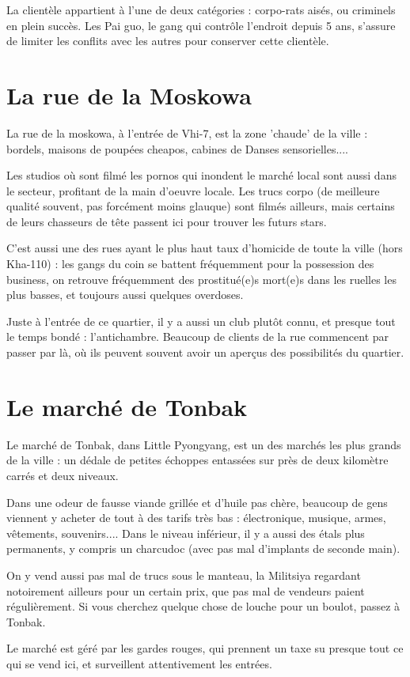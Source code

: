 \documentclass[10pt,a4paper]{book}
\begin{document}
La clientèle appartient à l'une de deux catégories : corpo-rats aisés, ou criminels en plein succès. Les Pai guo, le gang qui contrôle l'endroit depuis 5 ans, s'assure de limiter les conflits avec les autres pour conserver cette clientèle.
\section{La rue de la Moskowa}
La rue de la moskowa, à l'entrée de Vhi-7, est la zone 'chaude' de la ville : bordels, maisons de poupées cheapos, cabines de Danses sensorielles....

Les studios où sont filmé les pornos qui inondent le marché local sont aussi dans le secteur, profitant de la main d'oeuvre locale. Les trucs corpo (de meilleure qualité souvent, pas forcément moins glauque) sont filmés ailleurs, mais certains de leurs chasseurs de tête passent ici pour trouver les futurs stars.

C'est aussi une des rues ayant le plus haut taux d'homicide de toute la ville (hors Kha-110) : les gangs du coin se battent fréquemment pour la possession des business, on retrouve fréquemment des prostitué(e)s mort(e)s dans les ruelles les plus basses, et toujours aussi quelques overdoses.

Juste à l'entrée de ce quartier, il y a aussi un club plutôt connu, et presque tout le temps bondé : l'antichambre. Beaucoup de clients de la rue commencent par passer par là, où ils peuvent souvent avoir un aperçus des possibilités du quartier.
\section{Le marché de Tonbak}
Le marché de Tonbak, dans Little Pyongyang, est un des marchés les plus grands de la ville : un dédale de petites échoppes entassées sur près de deux kilomètre carrés et deux niveaux.

Dans une odeur de fausse viande grillée et d'huile pas chère, beaucoup de gens viennent y acheter de tout à des tarifs très bas : électronique, musique, armes, vêtements, souvenirs.... Dans le niveau inférieur, il y a aussi des étals plus permanents, y compris un charcudoc (avec pas mal d'implants de seconde main). 

On y vend aussi pas mal de trucs sous le manteau, la Militsiya regardant notoirement ailleurs pour un certain prix, que pas mal de vendeurs paient régulièrement. Si vous cherchez quelque chose de louche pour un boulot, passez à Tonbak.

Le marché est géré par les gardes rouges, qui prennent un taxe su presque tout ce qui se vend ici, et surveillent attentivement les entrées.
\end{document}
